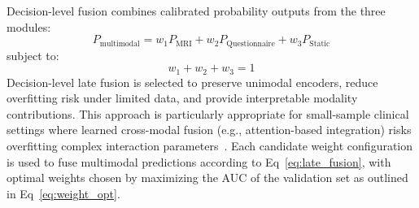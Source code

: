 \documentclass[10pt,letterpaper]{article}
\begin{document}
                                                                                                                  Decision-level fusion combines calibrated probability outputs from the three modules:
                                                                                                                  \begin{equation}
                                                                                                                  \label{eq:late_fusion}
                                                                                                                  P_{\text{multimodal}} = w_1 P_{\text{MRI}} + w_2 P_{\text{Questionnaire}} + w_3 P_{\text{Static}}
                                                                                                                  \end{equation}
                                                                                                                  subject to:
                                                                                                                  \begin{equation}
                                                                                                                  \label{eq:weight_sum}
                                                                                                                  w_1+w_2+w_3=1
                                                                                                                  \end{equation}
                                                                                                                  Decision-level late fusion is selected to preserve unimodal encoders, reduce overfitting risk under limited data, and provide interpretable modality contributions. This approach is particularly appropriate for small-sample clinical settings where learned cross-modal fusion (e.g., attention-based integration) risks overfitting complex interaction parameters~\cite{ref47}. Each candidate weight configuration is used to fuse multimodal predictions according to Eq~\ref{eq:late_fusion}, with optimal weights chosen by maximizing the AUC of the validation set as outlined in Eq~\ref{eq:weight_opt}.
\end{document}
